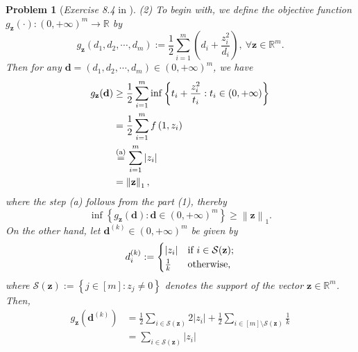 \documentclass[11pt]{article}
\newtheorem{problem}{Problem}
\numberwithin{equation}{problem}
\begin{document}
\begin{problem} [\emph{Exercise 8.4} in \cite{calafiore2014optimization}]
{\indent (2) To begin with, we define the objective function $g_{\mathbf{z}}(\cdot) : \left( 0, +\infty \right)^m \rightarrow \mathbb{R}$ by
\begin{equation*}
    g_{\mathbf{z}} \left( d_1, d_2, \cdots, d_m \right) := \frac{1}{2}
    \sum_{i=1}^{m} \left( d_i + \frac{z_{i}^2}{d_i} \right),\ \forall \mathbf{z} \in \mathbb{R}^m.
\end{equation*}
Then for any $\mathbf{d} = \left( d_1, d_2, \cdots, d_m \right) \in \left( 0, +\infty \right)^m$, we have
\begin{equation*}
    \begin{split}
        g_{\mathbf{z}}(\mathbf{d}) &\geq \frac{1}{2} \sum_{i=1}^{m} \inf \left\{ t_i + \frac{z_{i}^2}{t_i} : t_i \in \left( 0, +\infty \right) \right\} \\
        &= \frac{1}{2} \sum_{i=1}^{m} f \left( 1, z_i \right) \\
        &\stackrel{\textnormal{(a)}}{=} \sum_{i=1}^{m} \left| z_i \right| \\
        &= \left\| \mathbf{z} \right\|_1,
    \end{split}
\end{equation*}
where the step (a) follows from the part (1), thereby
\begin{equation}
    \label{eqn1.3}
    \inf \left\{ g_{\mathbf{z}}(\mathbf{d}) : \mathbf{d} \in \left( 0, +\infty \right)^m \right\} \geq \left\| \mathbf{z} \right\|_1.
\end{equation}
\indent On the other hand, let $\mathbf{d}^{(k)} \in \left( 0, +\infty \right)^m$ be given by
\begin{equation*}
    d_{i}^{(k)} :=
    \begin{cases}
        \left| z_i \right| & \textnormal{if } i \in \mathcal{S}(\mathbf{z}); \\
        \frac{1}{k} & \textnormal{otherwise,}
    \end{cases}
\end{equation*}
where $\mathcal{S}(\mathbf{z}) := \left\{ j \in [m] : z_j \neq 0 \right\}$ denotes the support of the vector $\mathbf{z} \in \mathbb{R}^m$. Then,
\begin{equation*}
    \begin{split}
        g_{\mathbf{z}} \left( \mathbf{d}^{(k)} \right)
        &= \frac{1}{2} \sum_{i \in \mathcal{S}(\mathbf{z})} 2 \left| z_i \right| + \frac{1}{2} \sum_{i \in [m] \setminus \mathcal{S}(\mathbf{z})} \frac{1}{k} \\
        &= \sum_{i \in \mathcal{S}(\mathbf{z})} \left| z_i \right|

\end{split}
\end{equation*}}
\end{problem}
\end{document}
